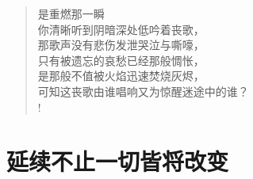 \documentclass[UTF8, 12pt, a4paper]{ctexrep} %
\begin{document}
\begin{verse}
    是重燃那一瞬\\
    你清晰听到阴暗深处低吟着丧歌，\\
    那歌声没有悲伤发泄哭泣与嘶嚎，\\
    只有被遗忘的哀愁已经那般惆怅，\\
    是那般不值被火焰迅速焚烧灰烬，\\
    可知这丧歌由谁唱响又为惊醒迷途中的谁？\\!

\end{verse}
\newpage

\section{延续不止一切皆将改变}
\newpage
\end{document}
